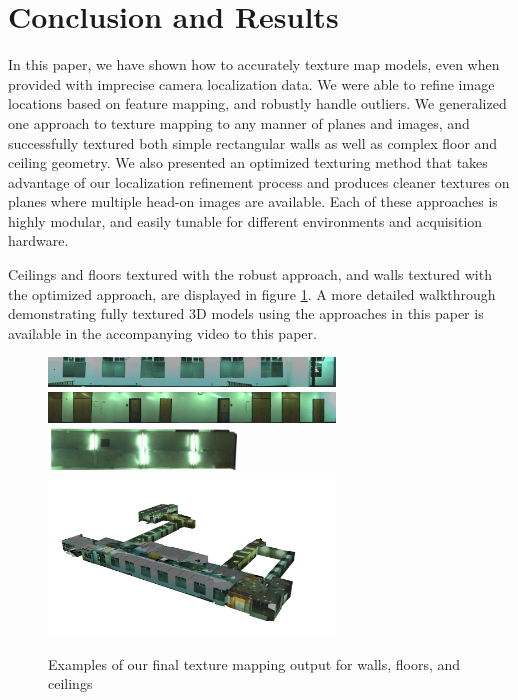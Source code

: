 \documentclass[10pt,twocolumn,letterpaper]{article}
\begin{document}
\section{Conclusion and Results}
In this paper, we have shown how to accurately texture map models,
even when provided with imprecise camera localization data. We were
able to refine image locations based on feature mapping, and robustly
handle outliers.  We generalized one approach to texture mapping to
any manner of planes and images, and successfully textured both simple
rectangular walls as well as complex floor and ceiling geometry. We
also presented an optimized texturing method that takes advantage of
our localization refinement process and produces cleaner textures on
planes where multiple head-on images are available. Each of these
approaches is highly modular, and easily tunable for different
environments and acquisition hardware.

Ceilings and floors textured
with the robust approach, and walls textured with the optimized
approach, are displayed in figure \ref{fig:results}. A more detailed
walkthrough demonstrating fully textured 3D models using the
approaches in this paper is available in the accompanying video to
this paper.

\begin{figure}
  \centering
  \includegraphics[width=3in]{4thfloor21.jpg}
  \includegraphics[width=3in]{4thfloor61.jpg}
  \includegraphics[width=2in]{4thfloor8.jpg}
  \includegraphics[width=3in]{fullmodel.png}
  \caption{Examples of our final texture mapping output for walls,
    floors, and ceilings}
  \label{fig:results}
\end{figure}

{\small   }
\end{document}
